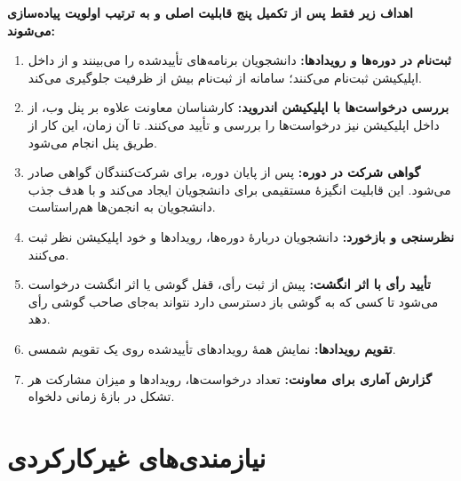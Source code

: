 \documentclass[a4paper,12pt]{article}
\newcommand{\engb}[1]{\textcolor{engblue}{\lr{#1}}}
\newcommand{\engp}[1]{\textcolor{engpurple}{\lr{#1}}}
\begin{document}
\textbf{اهداف زیر فقط پس از تکمیل پنج قابلیت اصلی و به ترتیب اولویت پیاده‌سازی می‌شوند:}
\begin{enumerate}

        \vspace*{0.2cm}
        \item \textbf{ثبت‌نام در دوره‌ها و رویدادها:} دانشجویان برنامه‌های تأییدشده را می‌بینند و از داخل اپلیکیشن ثبت‌نام می‌کنند؛ سامانه از ثبت‌نام بیش از ظرفیت جلوگیری می‌کند.
        
        \vspace*{0.2cm}
        \item \textbf{بررسی درخواست‌ها با اپلیکیشن اندروید:} کارشناسان معاونت علاوه بر پنل وب، از داخل اپلیکیشن نیز درخواست‌ها را بررسی و تأیید می‌کنند. تا آن زمان، این کار از طریق پنل \engb{Django Admin} انجام می‌شود.
        
        \vspace*{0.2cm}
        \item \textbf{گواهی شرکت در دوره:} پس از پایان دوره، برای شرکت‌کنندگان گواهی \engp{PDF} صادر می‌شود. این قابلیت انگیزهٔ مستقیمی برای دانشجویان ایجاد می‌کند و با هدف جذب دانشجویان به انجمن‌ها هم‌راستاست.
        
        \vspace*{0.2cm}
        \item \textbf{نظرسنجی و بازخورد:} دانشجویان دربارهٔ دوره‌ها، رویدادها و خود اپلیکیشن نظر ثبت می‌کنند.
        
        \vspace*{0.2cm}
        \item \textbf{تأیید رأی با اثر انگشت:} پیش از ثبت رأی، قفل گوشی یا اثر انگشت درخواست می‌شود تا کسی که به گوشی باز دسترسی دارد نتواند به‌جای صاحب گوشی رأی دهد.

        \vspace*{0.2cm}
        \item \textbf{تقویم رویدادها:} نمایش همهٔ رویدادهای تأییدشده روی یک تقویم شمسی.

        \vspace*{0.2cm}
	\item \textbf{گزارش آماری برای معاونت:} تعداد درخواست‌ها، رویدادها و میزان مشارکت هر تشکل در بازهٔ زمانی دلخواه.
\end{enumerate}

\newpage
\section{نیازمندی‌های غیرکارکردی}
\end{document}
